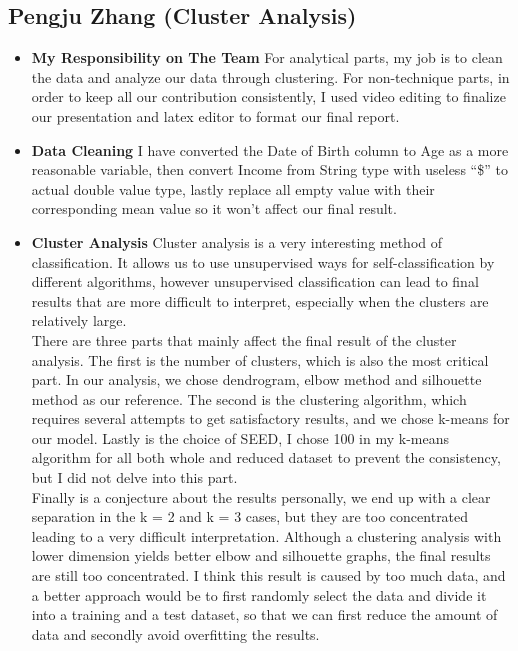 \documentclass[11pt]{article} %
\begin{document}
\subsection{Pengju Zhang (Cluster Analysis)}
\begin{itemize}
\item \textbf{My Responsibility on The Team}
\newline
For analytical parts, my job is to clean the data and analyze our data through clustering. For non-technique parts, in order to keep all our contribution consistently, I used video editing to finalize our presentation and latex editor to format our final report.
\item \textbf{Data Cleaning}
\newline
I have converted the Date of Birth column to Age as a more reasonable variable, then convert Income from String type with useless “\$” to actual double value type, lastly replace all empty value with their corresponding mean value so it won’t affect our final result.
\item \textbf{Cluster Analysis}
\newline
Cluster analysis is a very interesting method of classification. It allows us to use unsupervised ways for self-classification by different algorithms, however unsupervised classification can lead to final results that are more difficult to interpret, especially when the clusters are relatively large.
\\
There are three parts that mainly affect the final result of the cluster analysis. The first is the number of clusters, which is also the most critical part. In our analysis, we chose dendrogram, elbow method and silhouette method as our reference. The second is the clustering algorithm, which requires several attempts to get satisfactory results, and we chose k-means for our model. Lastly is the choice of SEED, I chose 100 in my k-means algorithm for all both whole and reduced dataset to prevent the consistency, but I did not delve into this part.
\\
Finally is a conjecture about the results personally, we end up with a clear separation  in the k = 2 and k = 3 cases, but they are too concentrated leading to a very difficult interpretation. Although a clustering analysis with lower dimension yields better elbow and silhouette graphs, the final results are still too concentrated. I think this result is caused by too much data, and a better approach would be to first randomly select the data and divide it into a training and a test dataset, so that we can first reduce the amount of data and secondly avoid overfitting the results.

\end{itemize}
\end{document}
